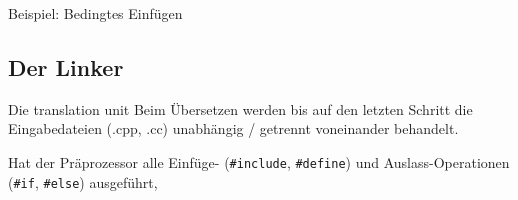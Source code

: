 \begin{frame}{Beispiel: Bedingtes Einfügen}
	\footnotesize
	
\end{frame}




\subsection{Der Linker}

\begin{frame}[fragile]{Die translation unit}
	Beim Übersetzen werden bis auf den letzten Schritt die Eingabedateien (.cpp, .cc) unabhängig / getrennt voneinander behandelt.
	
	Hat der Präprozessor alle Einfüge- (\verb|#include|, \verb|#define|) und Auslass-Operationen (\verb|#if|, \verb|#else|) ausgeführt, 
\end{frame}
